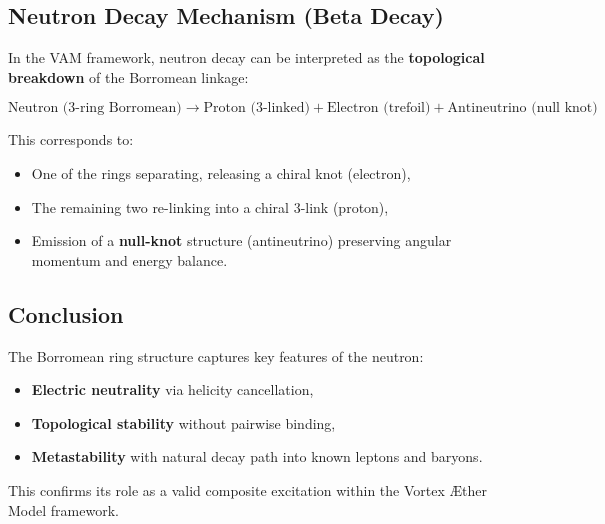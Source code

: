 \subsection{Neutron Decay Mechanism (Beta Decay)}

In the VAM framework, neutron decay can be interpreted as the \textbf{topological breakdown} of the Borromean linkage:

\[
\text{Neutron (3-ring Borromean)} \rightarrow \text{Proton (3-linked)} + \text{Electron (trefoil)} + \text{Antineutrino (null knot)}
\]

This corresponds to:

\begin{itemize}
    \item One of the rings separating, releasing a chiral knot (electron),
    \item The remaining two re-linking into a chiral 3-link (proton),
    \item Emission of a \textbf{null-knot} structure (antineutrino) preserving angular momentum and energy balance.
\end{itemize}

\subsection{Conclusion}

The Borromean ring structure captures key features of the neutron:
\begin{itemize}
    \item \textbf{Electric neutrality} via helicity cancellation,
    \item \textbf{Topological stability} without pairwise binding,
    \item \textbf{Metastability} with natural decay path into known leptons and baryons.
\end{itemize}

This confirms its role as a valid composite excitation within the Vortex Æther Model framework.
